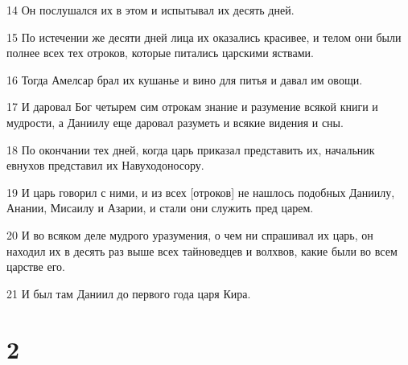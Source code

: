 \par 14 Он послушался их в этом и испытывал их десять дней.
\par 15 По истечении же десяти дней лица их оказались красивее, и телом они были полнее всех тех отроков, которые питались царскими яствами.
\par 16 Тогда Амелсар брал их кушанье и вино для питья и давал им овощи.
\par 17 И даровал Бог четырем сим отрокам знание и разумение всякой книги и мудрости, а Даниилу еще даровал разуметь и всякие видения и сны.
\par 18 По окончании тех дней, когда царь приказал представить их, начальник евнухов представил их Навуходоносору.
\par 19 И царь говорил с ними, и из всех [отроков] не нашлось подобных Даниилу, Анании, Мисаилу и Азарии, и стали они служить пред царем.
\par 20 И во всяком деле мудрого уразумения, о чем ни спрашивал их царь, он находил их в десять раз выше всех тайноведцев и волхвов, какие были во всем царстве его.
\par 21 И был там Даниил до первого года царя Кира.

\chapter{2}

